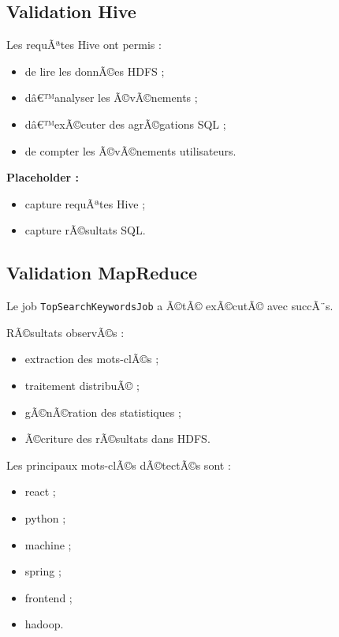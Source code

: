 ﻿\documentclass[12pt,a4paper]{report}
\begin{document}
\subsection{Validation Hive}

Les requÃªtes Hive ont permis :
\begin{itemize}
    \item de lire les donnÃ©es HDFS ;
    \item dâ€™analyser les Ã©vÃ©nements ;
    \item dâ€™exÃ©cuter des agrÃ©gations SQL ;
    \item de compter les Ã©vÃ©nements utilisateurs.
\end{itemize}

\vspace{0.3cm}

\textbf{Placeholder :}
\begin{itemize}
    \item capture requÃªtes Hive ;
    \item capture rÃ©sultats SQL.
\end{itemize}

\subsection{Validation MapReduce}

Le job \texttt{TopSearchKeywordsJob} a Ã©tÃ© exÃ©cutÃ© avec succÃ¨s.

RÃ©sultats observÃ©s :
\begin{itemize}
    \item extraction des mots-clÃ©s ;
    \item traitement distribuÃ© ;
    \item gÃ©nÃ©ration des statistiques ;
    \item Ã©criture des rÃ©sultats dans HDFS.
\end{itemize}

Les principaux mots-clÃ©s dÃ©tectÃ©s sont :
\begin{itemize}
    \item react ;
    \item python ;
    \item machine ;
    \item spring ;
    \item frontend ;
    \item hadoop.
\end{itemize}

\vspace{0.3cm}
\end{document}
